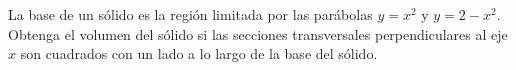 \item La base de un sólido es la región limitada por las parábolas $y = x^2$ y $y = 2 - x^2$. Obtenga el volumen del sólido si las secciones transversales perpendiculares al eje $x$ son cuadrados con un lado a lo largo de la base del sólido.
